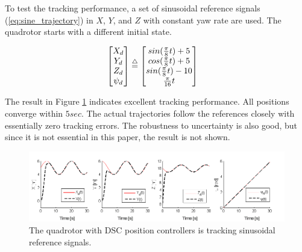 \documentclass[journal,11pt,onecolumn,draftclsnofoot,]{IEEEtran}
\begin{document}
To test the tracking performance, a set of sinusoidal reference signals (\ref{eq:sine_trajectory}) in $X$, $Y$, and $Z$ with constant yaw rate are used. The quadrotor starts with a different initial state.

\begin{equation}
\label{eq:sine_trajectory}
\begin{split}
\begin{bmatrix}
X_d \\ 
Y_d \\ 
Z_d \\
\psi_d \\
\end{bmatrix} &\buildrel\triangle\over = 
\begin{bmatrix}
sin(\frac{\pi}{8} t ) + 5 \\
cos(\frac{\pi}{8} t ) + 5 \\
sin(\frac{\pi}{8} t ) - 10 \\
\frac{\pi}{16} t \\
\end{bmatrix}
\end{split}
\end{equation}

The result in Figure \ref{fig:sliding_result} indicates excellent tracking performance. All positions converge within $5 sec$. The actual trajectories follow the references closely with essentially zero tracking errors. The robustness to uncertainty is also good, but since it is not essential in this paper, the result is not shown.

\begin{figure}
\centering
\includegraphics[width=\columnwidth]{sliding_result_1x4}
\caption{The quadrotor with DSC position controllers is tracking sinusoidal reference signals.}
\label{fig:sliding_result}
\end{figure}
\end{document}
